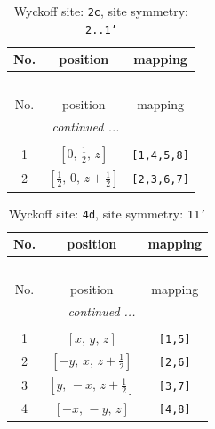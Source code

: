 \documentclass[fleqn,8pt]{jsarticle}
\begin{document}
\renewcommand{\arraystretch}{1.2}
\begin{longtable}{ccc}
\caption{Wyckoff site: {\tt 2c}, site symmetry: {\tt 2..1'}}
 \\
 \hline \hline
No. & position & mapping \\ \hline \endfirsthead

\multicolumn{2}{l}{\tablename\ \thetable{}} \\
 \hline \hline
No. & position & mapping \\ \hline \endhead

 \hline \hline
\multicolumn{2}{r}{\footnotesize\it continued ...} \\ \endfoot

 \hline \hline
\multicolumn{2}{r}{} \\ \endlastfoot

1 & $\left[ 0,\, \frac{1}{2},\, z \right]$ & {\tt [1,4,5,8]} \\ \hline
2 & $\left[ \frac{1}{2},\, 0,\, z + \frac{1}{2} \right]$ & {\tt [2,3,6,7]} \\
\end{longtable}
\renewcommand{\arraystretch}{1.2}
\begin{longtable}{ccc}
\caption{Wyckoff site: {\tt 4d}, site symmetry: {\tt 11'}}
 \\
 \hline \hline
No. & position & mapping \\ \hline \endfirsthead

\multicolumn{2}{l}{\tablename\ \thetable{}} \\
 \hline \hline
No. & position & mapping \\ \hline \endhead

 \hline \hline
\multicolumn{2}{r}{\footnotesize\it continued ...} \\ \endfoot

 \hline \hline
\multicolumn{2}{r}{} \\ \endlastfoot

1 & $\left[ x,\, y,\, z \right]$ & {\tt [1,5]} \\ \hline
2 & $\left[ - y,\, x,\, z + \frac{1}{2} \right]$ & {\tt [2,6]} \\ \hline
3 & $\left[ y,\, - x,\, z + \frac{1}{2} \right]$ & {\tt [3,7]} \\ \hline
4 & $\left[ - x,\, - y,\, z \right]$ & {\tt [4,8]} \\
\end{longtable}
\end{document}
